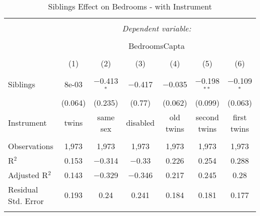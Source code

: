 
\begin{table}[!htbp] \centering 
  \caption{Siblings Effect on Bedrooms - with Instrument} 
  \label{} 
\begin{tabular}{@{\extracolsep{5pt}}lcccccc} 
\\[-1.8ex]\hline 
\hline \\[-1.8ex] 
 & \multicolumn{6}{c}{\textit{Dependent variable:}} \\ 
\cline{2-7} 
\\[-1.8ex] & \multicolumn{6}{c}{BedroomsCapta} \\ 
\\[-1.8ex] & (1) & (2) & (3) & (4) & (5) & (6)\\ 
\hline \\[-1.8ex] 
 Siblings & 8e-03 & $-$0.413$^{*}$ & $-$0.417 & $-$0.035 & $-$0.198$^{**}$ & $-$0.109$^{*}$ \\ 
  & (0.064) & (0.235) & (0.77) & (0.062) & (0.099) & (0.063) \\ 
 Instrument & twins & same sex & disabled & old twins & second twins & first twins \\
 \hline \\[-1.8ex] 
Observations & 1,973 & 1,973 & 1,973 & 1,973 & 1,973 & 1,973 \\ 
R$^{2}$ & 0.153 & $-$0.314 & $-$0.33 & 0.226 & 0.254 & 0.288 \\ 
Adjusted R$^{2}$ & 0.143 & $-$0.329 & $-$0.346 & 0.217 & 0.245 & 0.28 \\ 
Residual Std. Error & 0.193 & 0.24 & 0.241 & 0.184 & 0.181 & 0.177 \\ 
\hline 
\hline \\[-1.8ex] 
\end{tabular} 
\end{table} 

